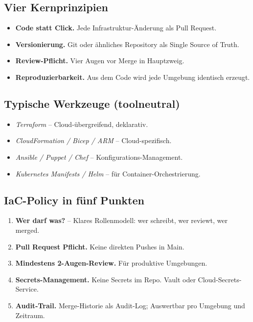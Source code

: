 \documentclass[11pt,a4paper,oneside]{article}
\newcommand{\fachbegriff}[1]{\textbf{#1}}
\begin{document}
\subsection{Vier Kernprinzipien}

\begin{itemize}
  \item \fachbegriff{Code statt Click.} Jede Infrastruktur-Änderung als Pull Request.
  \item \fachbegriff{Versionierung.} Git oder ähnliches Repository als Single Source of Truth.
  \item \fachbegriff{Review-Pflicht.} Vier Augen vor Merge in Hauptzweig.
  \item \fachbegriff{Reproduzierbarkeit.} Aus dem Code wird jede Umgebung identisch erzeugt.
\end{itemize}

\subsection{Typische Werkzeuge (toolneutral)}

\begin{itemize}
  \item \emph{Terraform} -- Cloud-übergreifend, deklarativ.
  \item \emph{CloudFormation / Bicep / ARM} -- Cloud-spezifisch.
  \item \emph{Ansible / Puppet / Chef} -- Konfigurations-Management.
  \item \emph{Kubernetes Manifests / Helm} -- für Container-Orchestrierung.
\end{itemize}

\subsection{IaC-Policy in fünf Punkten}

\begin{enumerate}
  \item \fachbegriff{Wer darf was?} -- Klares Rollenmodell: wer schreibt, wer reviewt, wer merged.
  \item \fachbegriff{Pull Request Pflicht.} Keine direkten Pushes in Main.
  \item \fachbegriff{Mindestens 2-Augen-Review.} Für produktive Umgebungen.
  \item \fachbegriff{Secrets-Management.} Keine Secrets im Repo. Vault oder Cloud-Secrets-Service.
  \item \fachbegriff{Audit-Trail.} Merge-Historie als Audit-Log; Auswertbar pro Umgebung und Zeitraum.
\end{enumerate}
\end{document}
